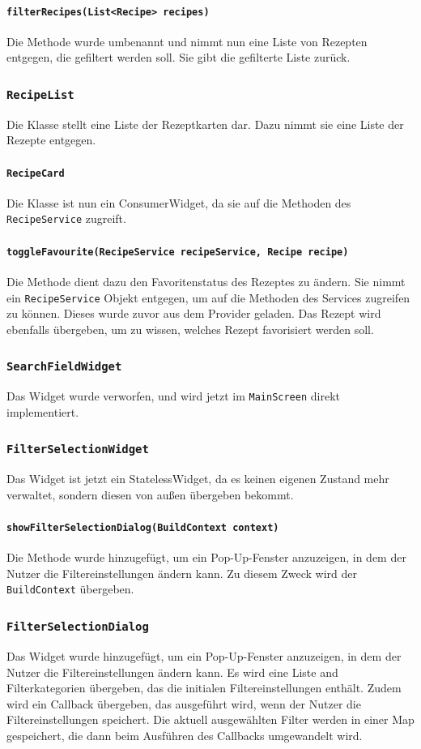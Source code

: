 \documentclass{implementierungsheft}
\begin{document}
\paragraph{\texttt{filterRecipes(List<Recipe> recipes)}}
Die Methode wurde umbenannt und nimmt nun eine Liste von Rezepten entgegen, die gefiltert werden soll. Sie gibt die gefilterte Liste zurück.
\subsubsection*{\texttt{RecipeList}}
Die Klasse stellt eine Liste der Rezeptkarten dar. Dazu nimmt sie eine Liste der Rezepte entgegen.
\paragraph{\texttt{RecipeCard}}
Die Klasse ist nun ein ConsumerWidget, da sie auf die Methoden des \texttt{RecipeService} zugreift.
\paragraph{\texttt{toggleFavourite(RecipeService recipeService, Recipe recipe)}}
Die Methode dient dazu den Favoritenstatus des Rezeptes zu ändern. Sie nimmt ein \texttt{RecipeService} Objekt entgegen, um auf die Methoden des Services zugreifen zu können. Dieses wurde zuvor aus dem Provider geladen. Das Rezept wird ebenfalls übergeben, um zu wissen, welches Rezept favorisiert werden soll.
\subsubsection*{\texttt{SearchFieldWidget}}
Das Widget wurde verworfen, und wird jetzt im \texttt{MainScreen} direkt implementiert.
\subsubsection*{\texttt{FilterSelectionWidget}}
Das Widget ist jetzt ein StatelessWidget, da es keinen eigenen Zustand mehr verwaltet, sondern diesen von außen übergeben bekommt.
\paragraph{\texttt{showFilterSelectionDialog(BuildContext context)}}
Die Methode wurde hinzugefügt, um ein Pop-Up-Fenster anzuzeigen, in dem der Nutzer die Filtereinstellungen ändern kann. Zu diesem Zweck wird der \texttt{BuildContext} übergeben.
\subsubsection*{\texttt{FilterSelectionDialog}}
Das Widget wurde hinzugefügt, um ein Pop-Up-Fenster anzuzeigen, in dem der Nutzer die Filtereinstellungen ändern kann. Es wird eine Liste and Filterkategorien übergeben, das die initialen Filtereinstellungen enthält. Zudem wird ein Callback übergeben, das ausgeführt wird, wenn der Nutzer die Filtereinstellungen speichert. Die aktuell ausgewählten Filter werden in einer Map gespeichert, die dann beim Ausführen des Callbacks umgewandelt wird.
\end{document}
